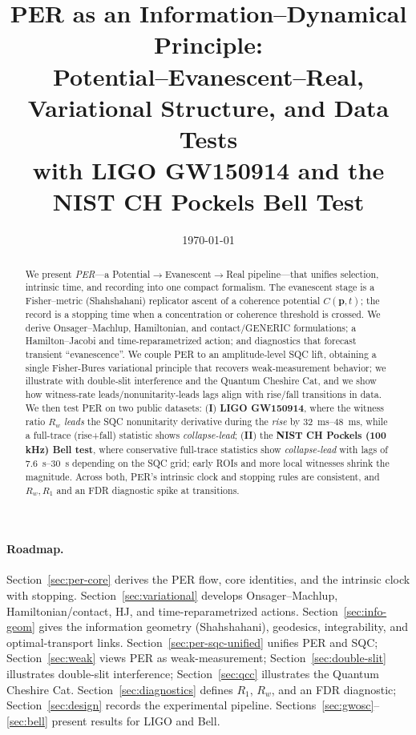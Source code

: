 \documentclass[11pt]{article}
\title{PER as an Information--Dynamical Principle:\\
Potential--Evanescent--Real, Variational Structure, and Data Tests\\
{\large with LIGO GW150914 and the NIST CH Pockels Bell Test}}
\author{}
\date{\today}
\newcommand{\p}{\bm{p}}
\begin{document}
\maketitle

\begin{abstract}
We present \emph{PER}---a Potential$\to$Evanescent$\to$Real pipeline---that unifies selection, intrinsic time, and recording into one compact formalism.
The evanescent stage is a Fisher--metric (Shahshahani) replicator ascent of a coherence potential $C(\p,t)$; the record is a stopping time when a concentration or coherence threshold is crossed.
We derive Onsager--Machlup, Hamiltonian, and contact/GENERIC formulations; a Hamilton--Jacobi and time-reparametrized action; and diagnostics that forecast transient ``evanescence''.
We couple PER to an amplitude‑level SQC lift, obtaining a single Fisher-Bures variational principle that recovers weak‑measurement behavior; we illustrate with double‑slit interference and the Quantum Cheshire Cat, and we show how witness‑rate leads/nonunitarity‑leads lags align with rise/fall transitions in data.
We then test PER on two public datasets: (\textbf{I}) \textbf{LIGO GW150914}, where the witness ratio $R_w$ \emph{leads} the SQC nonunitarity derivative during the \emph{rise} by \SIrange{32}{48}{ms}, while a full-trace (rise+fall) statistic shows \emph{collapse-lead}; (\textbf{II}) the \textbf{NIST CH Pockels (100\,kHz) Bell test}, where conservative full-trace statistics show \emph{collapse-lead} with lags of \SIrange{7.6}{30}{s} depending on the SQC grid; early ROIs and more local witnesses shrink the magnitude.
Across both, PER's intrinsic clock and stopping rules are consistent, and $R_w,R_1$ and an FDR diagnostic spike at transitions.
\end{abstract}

\paragraph{Roadmap.}
Section~\ref{sec:per-core} derives the PER flow, core identities, and the intrinsic clock with stopping.
Section~\ref{sec:variational} develops Onsager--Machlup, Hamiltonian/contact, HJ, and time-reparametrized actions.
Section~\ref{sec:info-geom} gives the information geometry (Shahshahani), geodesics, integrability, and optimal-transport links.
Section~\ref{sec:per-sqc-unified} unifies PER and SQC; 
Section~\ref{sec:weak} views PER as weak-measurement; 
Section~\ref{sec:double-slit} illustrates double-slit interference; Section~\ref{sec:qcc} illustrates the Quantum Cheshire Cat.
Section~\ref{sec:diagnostics} defines $R_1$, $R_w$, and an FDR diagnostic; Section~\ref{sec:design} records the experimental pipeline.
Sections~\ref{sec:gwosc}--\ref{sec:bell} present results for LIGO and Bell.
\end{document}
